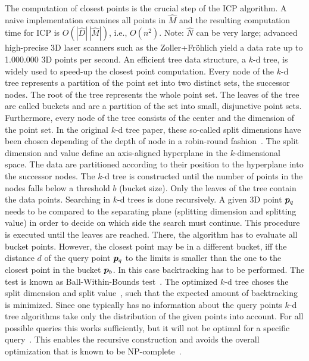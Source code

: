 \documentclass[twocolumn,oneside]{book}
\newcommand{\V}[1]{\vector{#1}}  %
\begin{document}
The computation of closest points is the crucial step of the ICP
algorithm. A naive implementation examines all points in $\hat M$ and
the resulting computation time for ICP is $O(|\hat D|\,|\hat M|)$,
i.e., $O(n^2)$. Note: $\hat N$ can be very large; advanced
high-precise 3D laser scanners such as the Zoller+Fr\"ohlich yield a
data rate up to 1.000.000 3D points per second. An efficient tree data
structure, a $k$-d tree, is widely used to speed-up the closest point
computation. Every node of the $k$-d tree represents a partition of
the point set into two distinct sets, the successor nodes. The root of
the tree represents the whole point set. The leaves of the tree are
called buckets and are a partition of the set into small, disjunctive
point sets. Furthermore, every node of the tree consists of the center
and the dimension of the point set.  In the original $k$-d tree paper,
these so-called split dimensions have been chosen depending of the
depth of node in a robin-round fashion~\cite{Bentley_1975}.  The split
dimension and value define an axis-aligned hyperplane in the
$k$-dimensional space. The data are partitioned according to their
position to the hyperplane into the successor nodes. The $k$-d tree is
constructed until the number of points in the nodes falls below a
threshold $b$ (bucket size). Only the leaves of the tree contain the
data points. Searching in $k$-d trees is done recursively. A given 3D
point $\V p_q$ needs to be compared to the separating plane (splitting
dimension and splitting value) in order to decide on which side the
search must continue. This procedure is executed until the leaves are
reached. There, the algorithm has to evaluate all bucket
points. However, the closest point may be in a different bucket, iff
the distance $d$ of the query point $\V p_q$ to the limits is smaller
than the one to the closest point in the bucket $\V p_b$.  In this
case backtracking has to be performed. The test is known as
Ball-Within-Bounds test~\cite{Bentley_1975, Friedman_1977,
  Greenspan_2003}. The optimized $k$-d tree choses the split dimension
and split value~\cite{Friedman_1977}, such that the expected amount of
backtracking is minimized.  Since one typically has no information
about the query points $k$-d tree algorithms take only the
distribution of the given points into account. For all possible
queries this works sufficiently, but it will not be optimal for a
specific query~\cite{Friedman_1977}. This enables the recursive
construction and avoids the overall optimization that is known to be
NP-complete~\cite{Hyafil_1977}.
\end{document}
